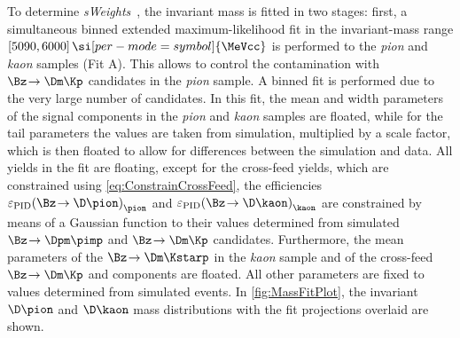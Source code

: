 To determine \emph{sWeights}~\cite{Pivk:2004ty}, the invariant \Bz mass is fitted in two stages:
first, a simultaneous binned extended maximum-likelihood fit in the invariant-mass range $[5090, 6000]\,\si[per-mode=symbol]{\MeVcc}$ is performed to the \emph{pion} and \emph{kaon} samples (Fit A).
This allows to control the contamination with $\Bz\!\to\Dm\Kp$ candidates in the \emph{pion} sample.
A binned fit is performed due to the very large number of candidates.
In this fit, the mean and width parameters of the signal components in the \emph{pion} and \emph{kaon} samples are floated, while for the tail parameters the values are taken from simulation, multiplied by a scale factor, which is then floated to allow for differences between the simulation and data.
All yields in the fit are floating, except for the cross-feed yields, which are constrained using \cref{eq:ConstrainCrossFeed}, \ie the efficiencies $\varepsilon_{\text{PID}}\!\left(\Bz\!\to\D \pion\right)_{\pion}$ and $\varepsilon_{\text{PID}}\!\left(\Bz\!\to\D \kaon\right)_{\kaon}$ are constrained by means of a Gaussian function to their values determined from simulated $\Bz\!\to\Dpm\pimp$ and $\Bz\!\to\Dm\Kp$ candidates.
Furthermore, the mean parameters of the $\Bz\!\to\Dm\Kstarp$ in the \emph{kaon} sample and of the cross-feed $\Bz\!\to\Dm\Kp$ and \BdToDpi components are floated.
All other parameters are fixed to values determined from simulated events.
In \cref{fig:MassFitPlot}, the invariant $\D\pion$  and $\D\kaon$ mass distributions with the fit projections overlaid are shown.

